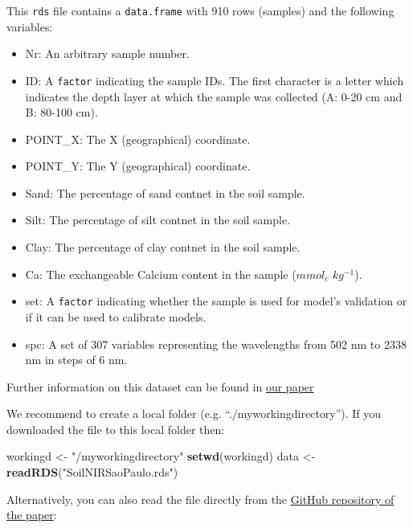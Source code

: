 \documentclass[]{book}
\newenvironment{Shaded}{\begin{snugshade}}{\end{snugshade}}
\newcommand{\KeywordTok}[1]{\textcolor[rgb]{0.13,0.29,0.53}{\textbf{#1}}}
\newcommand{\NormalTok}[1]{#1}
\newcommand{\StringTok}[1]{\textcolor[rgb]{0.31,0.60,0.02}{#1}}
\providecommand{\tightlist}{%
  \setlength{\itemsep}{0pt}\setlength{\parskip}{0pt}}
\begin{document}
This \texttt{rds} file contains a \texttt{data.frame} with 910 rows (samples) and the following variables:

\begin{itemize}
\tightlist
\item
  Nr: An arbitrary sample number.
\item
  ID: A \texttt{factor} indicating the sample IDs. The first character is a letter which indicates the depth layer at which the sample was collected (A: 0-20 cm and B: 80-100 cm).\\
\item
  POINT\_X: The X (geographical) coordinate.
\item
  POINT\_Y: The Y (geographical) coordinate.
\item
  Sand: The percentage of sand contnet in the soil sample.
\item
  Silt: The percentage of silt contnet in the soil sample.
\item
  Clay: The percentage of clay contnet in the soil sample.
\item
  Ca: The exchangeable Calcium content in the sample (\(mmol_{c}\) \(kg^{−1}\)).
\item
  set: A \texttt{factor} indicating whether the sample is used for model's validation or if it can be used to calibrate models.
\item
  spc: A set of 307 variables representing the wavelengths from 502 nm to 2338 nm in steps of 6 nm.
\end{itemize}

Further information on this dataset can be found in \href{https://onlinelibrary.wiley.com/doi/epdf/10.1111/ejss.12752}{our paper}

We recommend to create a local folder (e.g. ``./myworkingdirectory''). If you downloaded the file to this local folder then:

\begin{Shaded}
\begin{Highlighting}[]
\NormalTok{workingd <-}\StringTok{ "/myworkingdirectory"}
\KeywordTok{setwd}\NormalTok{(workingd)}
\NormalTok{data <-}\StringTok{ }\KeywordTok{readRDS}\NormalTok{(}\StringTok{"SoilNIRSaoPaulo.rds"}\NormalTok{)}
\end{Highlighting}
\end{Shaded}

Alternatively, you can also read the file directly from the \href{https://github.com/l-ramirez-lopez/VNIR_spectroscopy_for_robust_soil_mapping}{GitHub repository of the paper}:
\end{document}
